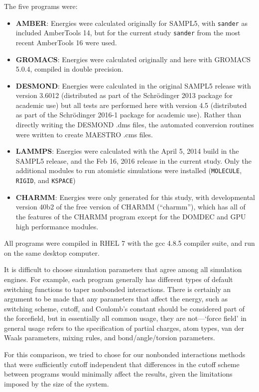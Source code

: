 The five programs were:
\begin{itemize} 
\item {\bf AMBER}: Energies were calculated originally for SAMPL5, with
  {\tt sander} as included AmberTools 14, but for the current study
  {\tt sander} from the most recent AmberTools 16 were used.
\item {\bf GROMACS}: Energies were calculated originally and here with
  GROMACS 5.0.4, compiled in double precision.
\item {\bf DESMOND}: Energies were calculated in the original
  SAMPL5 release with version 3.6012 (distributed as part of the Schr\"odinger
  2013 package for academic use) but all tests are performed here with
  version 4.5 (distributed as part of the Schr\"odinger
  2016-1 package for academic use).  Rather than directly writing the
  DESMOND .dms files, the automated conversion routines were written to
  create MAESTRO .cms files.
\item {\bf LAMMPS}: Energies were calculated with the April 5,
  2014 build in the SAMPL5 release, and the Feb 16, 2016 release in
  the current study. Only the additional modules to run atomistic
  simulations were installed ({\tt MOLECULE}, {\tt RIGID}, and {\tt KSPACE})
\item {\bf CHARMM}: Energies were only generated for this study, with
  developmental version 40b2 of the free version of CHARMM (``charmm''), which has all of the features of the CHARMM program except for the DOMDEC and GPU high performance modules.
\end{itemize}
All programs were compiled in RHEL 7 with the gcc 4.8.5 compiler
suite, and run on the same desktop computer.

It is difficult to choose simulation parameters that agree among all
simulation engines. For example, each program generally has different
types of default switching functions to taper nonbonded
interactions. There is certainly an argument to be made that any
parameters that affect the energy, such as switching scheme, cutoff,
and Coulomb's constant should be considered part of the forcefield,
but in essentially all common usage, they are not---`force field' in
general usage refers to the specification of partial charges, atom
types, van der Waals parameters, mixing rules, and bond/angle/torsion
parameters.

For this comparison, we tried to chose for our nonbonded
interactions methods that were sufficiently cutoff independent that
differences in the cutoff scheme between programs would minimally
affect the results, given the limitations imposed by the size of the
system. 

